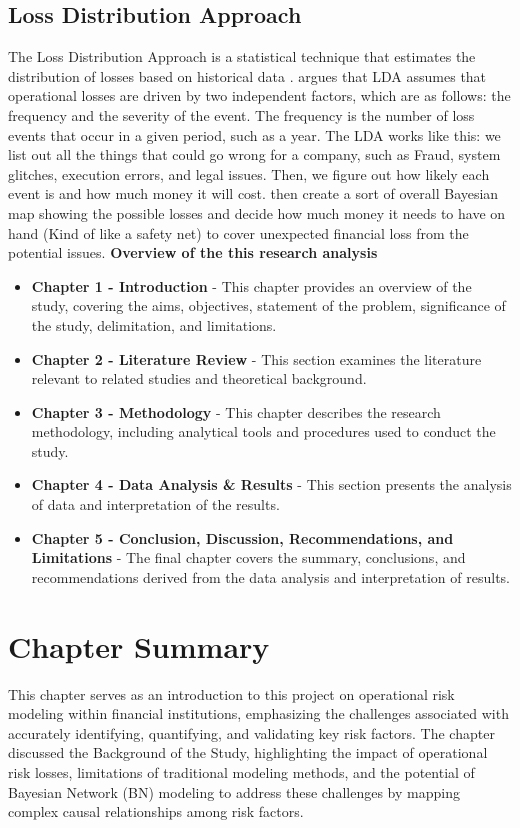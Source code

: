 \subsection{Loss Distribution Approach}
The Loss Distribution Approach is a statistical technique that estimates the distribution of losses based on historical data \parencite{wang_method_2017}. \textcite{hadley_selection_2019} argues that LDA assumes that operational losses are driven by two independent factors, which are as follows: the frequency and the severity of the event. The frequency is the number of loss events that occur in a given period, such as a year. The LDA works like this: we list out all the things that could go wrong for a company, such as Fraud, system glitches, execution errors, and legal issues. Then, we figure out how likely each event is and how much money it will cost. then create a sort of overall Bayesian map showing the possible losses and decide how much money it needs to have on hand (Kind of like a safety net) to cover unexpected financial loss from the potential issues.
\newpage
\textbf{Overview of the this research analysis}
\begin{itemize}
    \item \textbf{Chapter 1 - Introduction} - This chapter provides an overview of the study, covering the aims, objectives, statement of the problem, significance of the study, delimitation, and limitations.
    
    \item \textbf{Chapter 2 - Literature Review} - This section examines the literature relevant to related studies and theoretical background.
    
    \item \textbf{Chapter 3 - Methodology} - This chapter describes the research methodology, including analytical tools and procedures used to conduct the study.
    
    \item \textbf{Chapter 4 - Data Analysis \& Results} - This section presents the analysis of data and interpretation of the results.
    
    \item \textbf{Chapter 5 - Conclusion, Discussion, Recommendations, and Limitations} - The final chapter covers the summary, conclusions, and recommendations derived from the data analysis and interpretation of results.
\end{itemize}
\newpage
\section{Chapter Summary}
This chapter serves as an introduction to this project on operational risk modeling within financial institutions, emphasizing the challenges associated with accurately identifying, quantifying, and validating key risk factors. The chapter discussed the Background of the Study, highlighting the impact of operational risk losses, limitations of traditional modeling methods, and the potential of Bayesian Network (BN) modeling to address these challenges by mapping complex causal relationships among risk factors. 

